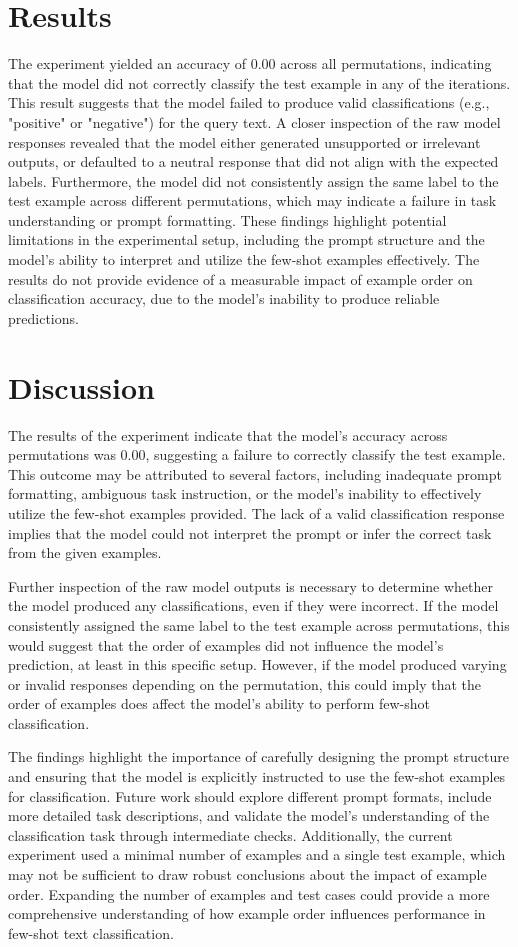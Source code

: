 \documentclass{article}
\begin{document}
\section{Results}

The experiment yielded an accuracy of 0.00 across all permutations, indicating that the model did not correctly classify the test example in any of the iterations. This result suggests that the model failed to produce valid classifications (e.g., "positive" or "negative") for the query text. A closer inspection of the raw model responses revealed that the model either generated unsupported or irrelevant outputs, or defaulted to a neutral response that did not align with the expected labels. Furthermore, the model did not consistently assign the same label to the test example across different permutations, which may indicate a failure in task understanding or prompt formatting. These findings highlight potential limitations in the experimental setup, including the prompt structure and the model's ability to interpret and utilize the few-shot examples effectively. The results do not provide evidence of a measurable impact of example order on classification accuracy, due to the model's inability to produce reliable predictions.
\section{Discussion}
The results of the experiment indicate that the model's accuracy across permutations was 0.00, suggesting a failure to correctly classify the test example. This outcome may be attributed to several factors, including inadequate prompt formatting, ambiguous task instruction, or the model's inability to effectively utilize the few-shot examples provided. The lack of a valid classification response implies that the model could not interpret the prompt or infer the correct task from the given examples. 

Further inspection of the raw model outputs is necessary to determine whether the model produced any classifications, even if they were incorrect. If the model consistently assigned the same label to the test example across permutations, this would suggest that the order of examples did not influence the model's prediction, at least in this specific setup. However, if the model produced varying or invalid responses depending on the permutation, this could imply that the order of examples does affect the model's ability to perform few-shot classification.

The findings highlight the importance of carefully designing the prompt structure and ensuring that the model is explicitly instructed to use the few-shot examples for classification. Future work should explore different prompt formats, include more detailed task descriptions, and validate the model's understanding of the classification task through intermediate checks. Additionally, the current experiment used a minimal number of examples and a single test example, which may not be sufficient to draw robust conclusions about the impact of example order. Expanding the number of examples and test cases could provide a more comprehensive understanding of how example order influences performance in few-shot text classification.
\end{document}
